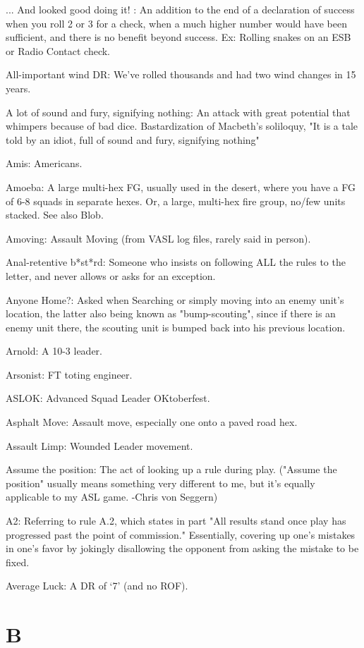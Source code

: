 \documentclass[letterpaper]{article}
\begin{document}
... And looked good doing it! : An addition to the end of a declaration of success when you roll 2 or 3 for a check, when a much higher number would have been sufficient, and there is no benefit beyond success. Ex: Rolling snakes on an ESB or Radio Contact check.

All-important wind DR: We've rolled thousands and had two wind changes in 15 years.

A lot of sound and fury, signifying nothing: An attack with great potential that whimpers because of bad dice. Bastardization of Macbeth's soliloquy, "It is a tale told by an idiot, full of sound and fury, signifying nothing"

Amis: Americans.

Amoeba: A large multi-hex FG, usually used in the desert, where you have a FG of 6-8 squads in separate hexes. Or, a large, multi-hex fire group, no/few units stacked. See also Blob.

Amoving: Assault Moving (from VASL log files, rarely said in person).

Anal-retentive b*st*rd: Someone who insists on following ALL the rules to the letter, and never allows or asks for an exception.

Anyone Home?: Asked when Searching or simply moving into an enemy unit's location, the latter also being known as "bump-scouting", since if there is an enemy unit there, the scouting unit is bumped back into his previous location.

Arnold: A 10-3 leader.

Arsonist: FT toting engineer.

ASLOK: Advanced Squad Leader OKtoberfest.

Asphalt Move: Assault move, especially one onto a paved road hex.

Assault Limp:  Wounded Leader movement.

Assume the position: The act of looking up a rule during play. ("Assume the position" usually means something very different to me, but it's equally applicable to my ASL game. -Chris von Seggern)

A2: Referring to rule A.2, which states in part "All results stand once play has progressed past the point of commission." Essentially, covering up one's mistakes in one's favor by jokingly disallowing the opponent from asking the mistake to be fixed.

Average Luck: A DR of `7' (and no ROF).

\section{B}
\end{document}
